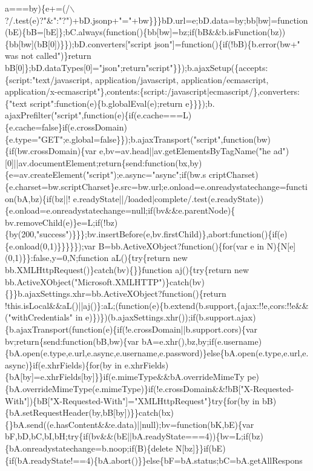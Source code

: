 \begin{DoxyCode}
{{      a===by)\{e+=(/\(\backslash\)?/.test(e)?"&":"?")+bD.jsonp+"="+bw\}\}\}bD.url=e;bD.data=by;bb[bw]=function(bE)\{bB=[bE]\};bC.always(function()\{bb[bw]=bz;if(bB&&b.isFunction(bz))\{bb[bw](bB[0])\}\});bD.converters["script
       json"]=function()\{if(!bB)\{b.error(bw+" was not called")\}return
       bB[0]\};bD.dataTypes[0]="json";return"script"\}\});b.ajaxSetup(\{accepts:\{script:"text/javascript, application/javascript, application/ecmascript,
       application/x-ecmascript"\},contents:\{script:/javascript|ecmascript/\},converters:\{"text script":function(e)\{b.globalEval(e);return
       e\}\}\});b.
      ajaxPrefilter("script",function(e)\{if(e.cache===L)\{e.cache=false\}if(e.crossDomain)\{e.type="GET";e.global=false\}\});b.ajaxTransport("script",function(bw)\{if(bw.crossDomain)\{var
       e,bv=av.head||av.getElementsByTagName("he
      ad")[0]||av.documentElement;return\{send:function(bx,by)\{e=av.createElement("script");e.async="async";if(bw.s
      criptCharset)\{e.charset=bw.scriptCharset\}e.src=bw.url;e.onload=e.onreadystatechange=function(bA,bz)\{if(bz||!
      e.readyState||/loaded|complete/.test(e.readyState))\{e.onload=e.onreadystatechange=null;if(bv&&e.parentNode)\{
      bv.removeChild(e)\}e=L;if(!bz)\{by(200,"success")\}\}\};bv.insertBefore(e,bv.firstChild)\},abort:function()\{if(e)\{e.onload(0,1)\}\}\}\}\});var B=bb.ActiveXObject?function()\{for(var e in N)\{N[e](0,1)\}\}:false,y=0,N;function
       aL()\{try\{return new bb.XMLHttpRequest()\}catch(bv)\{\}\}function aj()\{try\{return new
       bb.ActiveXObject("Microsoft.XMLHTTP")\}catch(bv)\{\}\}b.ajaxSettings.xhr=bb.ActiveXObject?function()\{return
       !this.isLocal&&aL()||aj()\}:aL;(function(e)\{b.extend(b.support,\{ajax:!!e,cors:!!e&&("withCredentials" in
       e)\})\})(b.ajaxSettings.xhr());if(b.support.ajax)\{b.ajaxTransport(function(e)\{if(!e.crossDomain||b.support.cors)\{var
       bv;return\{send:function(bB,bw)\{var
       bA=e.xhr(),bz,by;if(e.username)\{bA.open(e.type,e.url,e.async,e.username,e.password)\}else\{bA.open(e.type,e.url,e.async)\}if(e.xhrFields)\{for(by in
       e.xhrFields)\{bA[by]=e.xhrFields[by]\}\}if(e.mimeType&&bA.overrideMimeTy
      pe)\{bA.overrideMimeType(e.mimeType)\}if(!e.crossDomain&&!bB["X-Requested-With"])\{bB["X-Requested-With"]="XMLHttpRequest"\}try\{for(by in
       bB)\{bA.setRequestHeader(by,bB[by])\}\}catch(bx)\{\}bA.send((e.hasContent&&e.data)||null);bv=function(bK,bE)\{var
       bF,bD,bC,bI,bH;try\{if(bv&&(bE||bA.readyState===4))\{bv=L;if(bz)\{bA.onreadystatechange=b.noop;if(B)\{delete
       N[bz]\}\}if(bE)\{if(bA.readyState!==4)\{bA.abort()\}\}else\{bF=bA.status;bC=bA.getAllRespons
}}
\end{DoxyCode}
